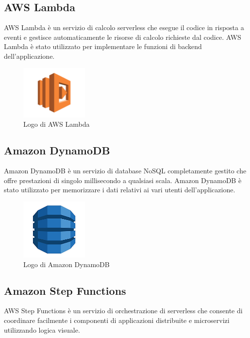 \subsection{AWS Lambda}
AWS Lambda è un servizio di calcolo serverless che esegue il codice in risposta a eventi e gestisce automaticamente le risorse di calcolo richieste dal codice. AWS Lambda è stato utilizzato per implementare le funzioni di backend dell'applicazione. 

\begin{figure}[h]
  \centering
  \includegraphics[width=0.3\textwidth]{img/tecnologie/AWS_Lambda.png}
  \caption{Logo di AWS Lambda}
  \label{fig:lambda}
\end{figure}

\subsection{Amazon DynamoDB}
Amazon DynamoDB è un servizio di database NoSQL completamente gestito che offre prestazioni di singolo millisecondo a qualsiasi scala. Amazon DynamoDB è stato utilizzato per memorizzare i dati relativi ai vari utenti dell'applicazione.

\begin{figure}[h]
  \centering
  \includegraphics[width=0.3\textwidth]{img/tecnologie/DynamoDB.png}
  \caption{Logo di Amazon DynamoDB}
  \label{fig:dynamodb}
\end{figure}

\subsection{Amazon Step Functions}
AWS Step Functions è un servizio di orchestrazione di serverless che consente di coordinare facilmente i componenti di applicazioni distribuite e microservizi utilizzando logica visuale. 


